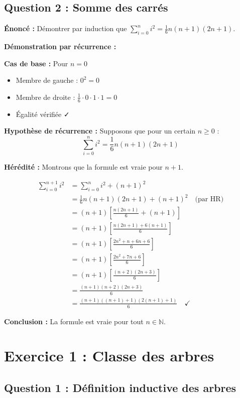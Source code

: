 \documentclass[12pt,a4paper]{article}
\begin{document}
\subsection{Question 2 : Somme des carrés}

\textbf{Énoncé :} Démontrer par induction que $\displaystyle\sum_{i=0}^{n} i^2 = \frac{1}{6}n(n+1)(2n+1)$.

\begin{demonstration}
\textbf{Démonstration par récurrence :}

\textbf{Cas de base :} Pour $n = 0$
\begin{itemize}
    \item Membre de gauche : $0^2 = 0$
    \item Membre de droite : $\frac{1}{6} \cdot 0 \cdot 1 \cdot 1 = 0$
    \item Égalité vérifiée ✓
\end{itemize}

\textbf{Hypothèse de récurrence :} Supposons que pour un certain $n \geq 0$ :
$$\sum_{i=0}^{n} i^2 = \frac{1}{6}n(n+1)(2n+1)$$

\textbf{Hérédité :} Montrons que la formule est vraie pour $n+1$.

\begin{align*}
\sum_{i=0}^{n+1} i^2 &= \sum_{i=0}^{n} i^2 + (n+1)^2 \\
&= \frac{1}{6}n(n+1)(2n+1) + (n+1)^2 \quad \text{(par HR)} \\
&= (n+1)\left[\frac{n(2n+1)}{6} + (n+1)\right] \\
&= (n+1)\left[\frac{n(2n+1) + 6(n+1)}{6}\right] \\
&= (n+1)\left[\frac{2n^2 + n + 6n + 6}{6}\right] \\
&= (n+1)\left[\frac{2n^2 + 7n + 6}{6}\right] \\
&= (n+1)\left[\frac{(n+2)(2n+3)}{6}\right] \\
&= \frac{(n+1)(n+2)(2n+3)}{6} \\
&= \frac{(n+1)((n+1)+1)(2(n+1)+1)}{6} \quad ✓
\end{align*}

\textbf{Conclusion :} La formule est vraie pour tout $n \in \mathbb{N}$.
\end{demonstration}

\newpage
\section{Exercice 1 : Classe des arbres}

\subsection{Question 1 : Définition inductive des arbres}
\end{document}
